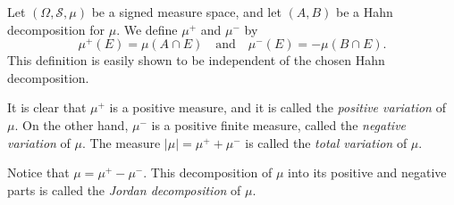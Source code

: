 \documentclass[12pt]{article}
\begin{document}
Let $(\Omega,\mathscr{S},\mu)$ be a signed measure space, and let $(A,B)$ be a Hahn decomposition for $\mu$. We define $\mu^+$ and $\mu^-$ by 
\[\mu^+(E) = \mu(A\cap E)\quad \mbox{and} \quad \mu^-(E)=-\mu(B\cap E).\]
This definition is easily shown to be independent of the chosen Hahn decomposition. 

It is clear that $\mu^+$ is a positive measure, and it is called the \emph{positive variation} of $\mu$. On the other hand, $\mu^-$ is a positive finite measure, called the \emph{negative variation} of $\mu$. 
The measure $|\mu|=\mu^+ + \mu^-$ is called the \emph{total variation} of $\mu$.

Notice that $\mu = \mu^+ - \mu^-$. This decomposition of $\mu$ into its positive and negative parts is called the \emph{Jordan decomposition} of $\mu$.
\end{document}
